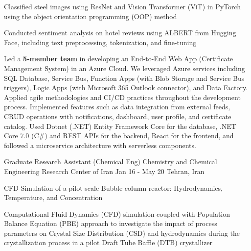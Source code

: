 \begin{cventries}
{\begin{cvitemsfree}
                \item{Classified steel images using ResNet and Vision Transformer (ViT) in PyTorch using the object orientation programming (OOP) method}
                \item{Conducted sentiment analysis on hotel reviews using ALBERT from Hugging Face, including text preprocessing, tokenization, and fine-tuning}
                \item{Led a \textbf{5-member team} in developing an End-to-End Web App (Certificate Management System) in an Azure Cloud. We leveraged Azure services including SQL Database, Service Bus, Function Apps (with Blob Storage and Service Bus triggers), Logic Apps (with Microsoft 365 Outlook connector), and Data Factory. Applied agile methodologies and CI/CD practices throughout the development process. Implemented features such as data integration from external feeds, CRUD operations with notifications, dashboard, user profile, and certificate catalog. Used Dotnet (.NET) Entity Framework Core for the database, .NET Core 7.0 (C\#) and REST APIs for the backend, React for the frontend, and followed a microservice architecture with serverless components.}
            \end{cvitemsfree}
        }
    \cventry
        {Graduate Research Assistant (Chemical Eng)} %
        {Chemistry and Chemical Engineering Research Center of Iran} %
        {Jan 16 - May 20} %
        {Tehran, Iran} %
        {
            \begin{cvitemsfree} %
                \item{CFD Simulation of a pilot-scale Bubble column reactor: Hydrodynamics, Temperature, and Concentration}
                \item{Computational Fluid Dynamics (CFD) simulation coupled with Population Balance Equation (PBE) approach to investigate the impact of process parameters on Crystal Size Distribution (CSD) and hydrodynamics during the crystallization process in a pilot Draft Tube Baffle (DTB) crystallizer}

\end{cvitemsfree}}
\end{cventries}
